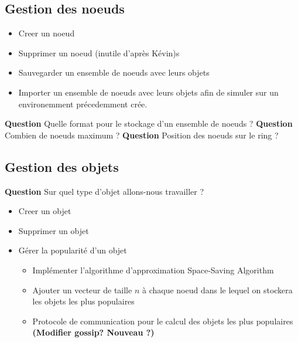 \documentclass[12pt]{article}
\begin{document}
\subsection{Gestion des noeuds}


\begin{itemize}
 \item Creer un noeud
 \item Supprimer un noeud (inutile d'après Kévin)s
 \item Sauvegarder un ensemble de noeuds avec leurs objets
 \item Importer un ensemble de noeuds avec leurs objets afin de simuler sur un environemment précedemment crée.
\end{itemize}

\vspace{0.5cm}

\textbf{Question } Quelle format pour le stockage d'un ensemble de noeuds ? \newline
\textbf{Question } Combien de noeuds maximum ? \newline
\textbf{Question } Position des noeuds sur le ring ? \newline


\subsection{Gestion des objets}

\textbf{Question } Sur quel type d'objet allons-nous travailler ? \newline

\begin{itemize}
 \item Creer un objet
 \item Supprimer un objet
 \item Gérer la popularité d'un objet
 \begin{itemize}
  \item Implémenter l'algorithme d'approximation Space-Saving Algorithm
  \item Ajouter un vecteur de taille $n$ à chaque noeud dans le lequel on stockera les objets les plus populaires
  \item Protocole de communication pour le calcul des objets les plus populaires \textbf{(Modifier gossip? Nouveau ?)}
 \end{itemize}
\end{itemize}

\vspace{0.5cm}
\end{document}
